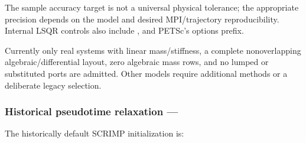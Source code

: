 \documentclass[letterpaper,10pt,english]{sphinxmanual}
\begin{document}
\begin{sphinxVerbatim}[commandchars=\\\{\}]
\end{sphinxVerbatim}

\sphinxAtStartPar
The sample accuracy target  is not a universal
physical tolerance; the appropriate precision depends on
the model and desired MPI/trajectory reproducibility.
Internal LSQR controls also include
, 
and PETSc’s  options prefix.

\sphinxAtStartPar
Currently only real systems with linear mass/stiffness,
a complete nonoverlapping algebraic/differential layout,
zero algebraic mass rows, and no lumped or substituted
ports are admitted. Other models require additional
methods or a deliberate legacy selection.


\subsubsection{Historical pseudo\sphinxhyphen{}time relaxation — }
\label{\detokenize{initialization:historical-pseudo-time-relaxation-pseudo}}
\sphinxAtStartPar
The historically default SCRIMP initialization is:

\begin{sphinxVerbatim}[commandchars=\\\{\}]
\end{sphinxVerbatim}
\end{document}
